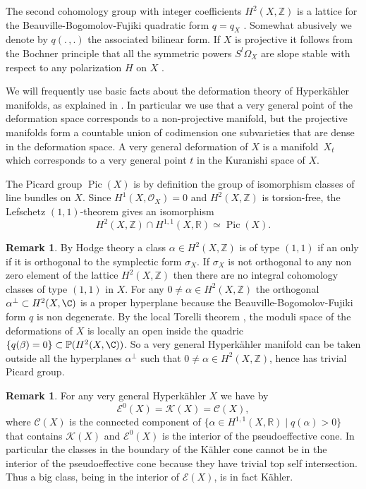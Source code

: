 \documentclass[JEP,XML,SOM,Unicode,NoEqCountersInSection,published]{cedram}
\let\mathcal\mathscr
\theoremstyle{plain}
\theoremstyle{definition}
\newtheorem{remark}[theorem]{Remark}
\newcommand{\R}{\ensuremath{\mathbb{R}}}
\newcommand{\Z}{\ensuremath{\mathbb{Z}}}
\newcommand{\PP}{\ensuremath{\mathbb{P}}}
\newcommand\sO{{\mathcal O}}
\DeclareMathOperator{\pic}{Pic}
\begin{document}
The second cohomology group with integer coefficients $H^2(X,\Z)$
is a lattice for the Beauville-Bogomolov-Fujiki quadratic form $q=q_X$ \cite[\S 8]{Bea83}. Somewhat abusively we denote by
$q(. \,, .)$ the associated bilinear form.
If $X$ is projective it follows from the Bochner principle that all the symmetric powers $S^l \Omega_X$ are slope stable
with respect to any polarization $H$ on $X$ \cite[Th.\,6]{Kob80}.

We will frequently use basic facts about the deformation theory of Hyperkähler manifolds, as explained in
\cite[\S 8]{Bea83} \cite[\S 1]{Huy99}. In particular we use that a very general point of the deformation
space corresponds to a non-projective manifold, but the projective manifolds form a countable union of codimension
one subvarieties that are dense in the deformation space. A very general deformation of $X$ is a manifold~$X_t$ which corresponds to a very general point $t$ in the Kuranishi space of $X$.

The Picard group $\pic (X)$ is by definition the group of isomorphism classes of line bundles on $X$.
Since $H^1(X, \sO_X)=0$ and $H^2(X, \Z)$ is torsion-free,
the Lefschetz $(1,1)$-theorem \cite[Prop.\,3.3.2]{Huy05} gives an isomorphism
\[
H^2(X, \Z) \cap H^{1,1}(X, \R) \simeq \pic (X).
\]

\begin{remark} \label{remarknosubvarieties}
By Hodge theory a class $\alpha \in H^2(X, \Z )$ is of type $(1,1)$ if an only if it is orthogonal to the symplectic form $\sigma_X$. If $\sigma_X$ is not orthogonal to any non zero element of the lattice $H^2(X, \Z )$ then there are no integral cohomology classes of type $(1,1)$ in $X$.
For any $0\neq \alpha \in H^2(X, \Z )$ the orthogonal $\alpha^\bot \subset H^2(X, \C )$ is a proper hyperplane because the Beauville-Bogomolov-Fujiki form $q$ is non degenerate. By the local Torelli theorem \cite[Th.\,5]{Bea83}, the moduli space of the deformations of $X$ is locally an open inside the quadric $\{ q(\beta)=0\} \subset \PP (H^2(X,\C))$. So a very general Hyperkähler manifold can be taken outside all the hyperplanes $\alpha^\bot $ such that $0\neq \alpha \in H^2(X, \Z)$, hence has trivial Picard group.
\end{remark}

\begin{remark} \label{remarkEgeneral}
For any very general Hyperkähler $X$ we have by \cite[Cor.\,1]{Huy03}
\[
\mathcal{E}^0(X)=\mathcal{K}(X) = \mathcal C (X),
\]
where $\mathcal C (X)$ is the connected component of $\{ \alpha \in H^{1,1}(X, \R) \mid q(\alpha)>0 \}$
that contains $\mathcal{K}(X)$ and $\mathcal{E}^0(X)$ is the interior of the pseudoeffective cone.
In particular the classes in the boundary of the Kähler cone cannot be in the interior of the pseudoeffective cone because they have trivial top self intersection. Thus a big class, being in the interior of $\mathcal E(X)$,
is in fact Kähler.
\end{remark}
\end{document}
